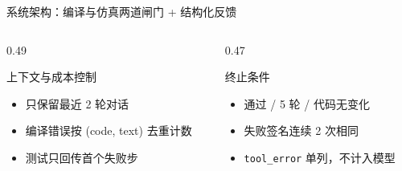 \documentclass[10pt,aspectratio=169]{beamer}
\begin{document}
\begin{frame}{系统架构：编译与仿真两道闸门 + 结构化反馈}
	\vspace{0.4em}
	\begin{columns}[T]
		\begin{column}{0.49\textwidth}
			\begin{block}{上下文与成本控制}
				\begin{itemize}
					\item 只保留最近 2 轮对话
					\item 编译错误按 (code, text) 去重计数
					\item 测试只回传首个失败步
				\end{itemize}
			\end{block}
		\end{column}
		\begin{column}{0.47\textwidth}
			\begin{block}{终止条件}
				\begin{itemize}
					\item 通过 / 5 轮 / 代码无变化
					\item 失败签名连续 2 次相同
					\item \texttt{tool\_error} 单列，不计入模型
				\end{itemize}
			\end{block}
		\end{column}
	\end{columns}
\end{frame}
\end{document}

